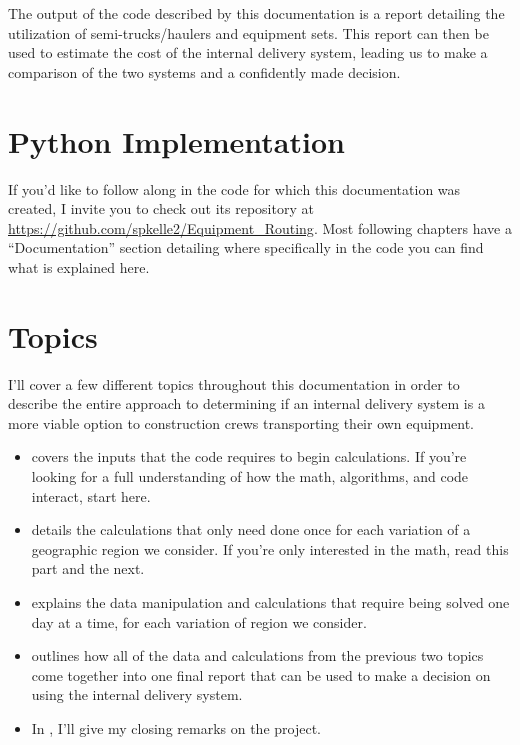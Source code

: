 \documentclass[letterpaper,10pt,english]{sphinxmanual}
\begin{document}
The output of the code described by this documentation is a report detailing
the utilization of semi-trucks/haulers and equipment sets. This report can
then be used to estimate the cost of the internal delivery system, leading us
to make a comparison of the two systems and a confidently made decision.


\section{Python Implementation}
\label{\detokenize{introduction:python-implementation}}
If you'd like to follow along in the code for which this documentation was
created, I invite you to check out its repository at
\url{https://github.com/spkelle2/Equipment\_Routing}. Most following chapters have
a ``Documentation'' section detailing where specifically in the code you can
find what is explained here.


\section{Topics}
\label{\detokenize{introduction:topics}}
I'll cover a few different topics throughout this documentation in order to
describe the entire approach to determining if an internal delivery system is
a more viable option to construction crews transporting their own equipment.
\begin{itemize}
\item {} 
{\hyperref[\detokenize{main:main}]{}} covers the inputs that the code requires to begin
calculations. If you're looking for a full understanding of how the
math, algorithms, and code interact, start here.

\item {} 
{\hyperref[\detokenize{variation:variation}]{}} details the calculations that only need done once
for each variation of a geographic region we consider. If you're only
interested in the math, read this part and the next.

\item {} 
{\hyperref[\detokenize{daily-routing:daily-routing}]{}} explains the data manipulation and calculations
that require being solved one day at a time, for each variation of
region we consider.

\item {} 
{\hyperref[\detokenize{reporting:reporting}]{}} outlines how all of the data and calculations from the
previous two topics come together into one final report that can be
used to make a decision on using the internal delivery system.

\item {} 
In {\hyperref[\detokenize{conclusion:conclusion}]{}}, I'll give my closing remarks on the project.

\end{itemize}
\end{document}
